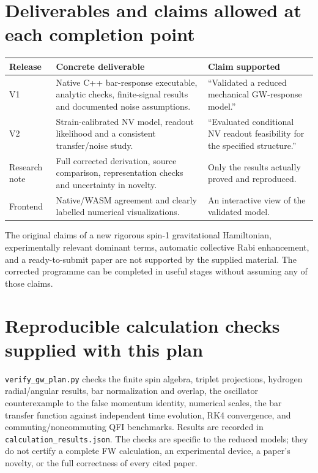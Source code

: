 \documentclass[a4paper,11pt]{article}
\newcommand{\code}[1]{\texttt{#1}}
\begin{document}
\section{Deliverables and claims allowed at each completion point}

\begin{tabularx}{\textwidth}{@{}P{24mm}XX@{}}\toprule
Release & Concrete deliverable & Claim supported\\\midrule
V1 & Native C++ bar-response executable, analytic checks, finite-signal results and documented noise assumptions. & ``Validated a reduced mechanical GW-response model.''\\
V2 & Strain-calibrated NV model, readout likelihood and a consistent transfer/noise study. & ``Evaluated conditional NV readout feasibility for the specified structure.''\\
Research note & Full corrected derivation, source comparison, representation checks and uncertainty in novelty. & Only the results actually proved and reproduced.\\
Frontend & Native/WASM agreement and clearly labelled numerical visualizations. & An interactive view of the validated model.\\
\bottomrule\end{tabularx}

The original claims of a new rigorous spin-1 gravitational Hamiltonian, experimentally relevant dominant terms, automatic collective Rabi enhancement, and a ready-to-submit paper are not supported by the supplied material. The corrected programme can be completed in useful stages without assuming any of those claims.

\appendix
\section{Reproducible calculation checks supplied with this plan}

\code{verify\_gw\_plan.py} checks the finite spin algebra, triplet projections, hydrogen radial/angular results, bar normalization and overlap, the oscillator counterexample to the false momentum identity, numerical scales, the bar transfer function against independent time evolution, RK4 convergence, and commuting/noncommuting QFI benchmarks. Results are recorded in \code{calculation\_results.json}. The checks are specific to the reduced models; they do not certify a complete FW calculation, an experimental device, a paper's novelty, or the full correctness of every cited paper.
\end{document}
